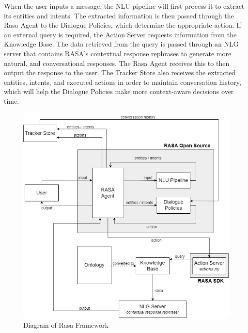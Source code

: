     When the user inputs a message, the NLU pipeline will first process it to extract its entities and intents. The extracted information is then passed through the Rasa Agent to the Dialogue Policies, which determine the appropriate action. If an external query is required, the Action Server requests information from the Knowledge Base. The data retrieved from the query is passed through an NLG server that contains RASA's contextual response rephrases to generate more natural, and conversational responses. The Rasa Agent receives this to then output the response to the user. The Tracker Store also receives the extracted entities, intents, and executed actions in order to maintain conversation history, which will help the Dialogue Policies make more context-aware decisions over time.

\begin{figure}[H]
    \centering
    \includegraphics[width=\linewidth]{figures/Rasa Framework.png}
    \caption{Diagram of Rasa Framework}
    \label{fig:rasa framework}
\end{figure}

